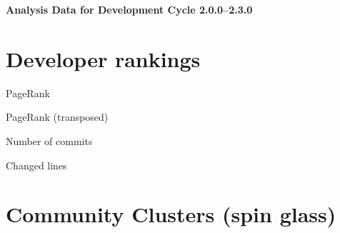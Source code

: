 \documentclass{article}
\begin{document}
\setlength{\parindent}{0pt}
\begin{center}
\begin{Large}
\textbf{Analysis Data for Development Cycle 2.0.0--2.3.0}
\end{Large}
\end{center}
\section{Developer rankings}
\begin{small}\renewcommand{\tabcolsep}{1pt}
\begin{minipage}{0.5\linewidth}
PageRank\\

\end{minipage}%
\begin{minipage}{0.5\linewidth}
PageRank (transposed)\\

\end{minipage}

\renewcommand{\tabcolsep}{5pt}
\begin{minipage}{0.5\linewidth}
Number of commits\\

\end{minipage}%
\begin{minipage}{0.5\linewidth}
Changed lines\\

\end{minipage}
\end{small}
\newpage\section{Community Clusters (spin glass)}
\end{document}
